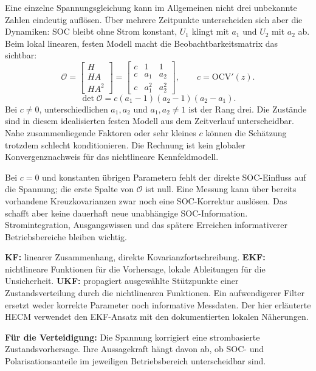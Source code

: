 Eine einzelne Spannungsgleichung kann im Allgemeinen nicht drei unbekannte Zahlen eindeutig auflösen. Über mehrere Zeitpunkte unterscheiden sich aber die Dynamiken: SOC bleibt ohne Strom konstant, $U_1$ klingt mit $a_1$ und $U_2$ mit $a_2$ ab. Beim lokal linearen, festen Modell macht die Beobachtbarkeitsmatrix das sichtbar:
\[
\mathcal O=\begin{bmatrix}H\\HA\\HA^2\end{bmatrix}
=\begin{bmatrix}c&1&1\\c&a_1&a_2\\c&a_1^2&a_2^2\end{bmatrix},
\qquad c=\mathrm{OCV}'(z).
\]
\[
\det\mathcal O=c(a_1-1)(a_2-1)(a_2-a_1).
\]
Bei $c\ne0$, unterschiedlichen $a_1,a_2$ und $a_1,a_2\ne1$ ist der Rang drei. Die Zustände sind in diesem idealisierten festen Modell aus dem Zeitverlauf unterscheidbar. Nahe zusammenliegende Faktoren oder sehr kleines $c$ können die Schätzung trotzdem schlecht konditionieren. Die Rechnung ist kein globaler Konvergenznachweis für das nichtlineare Kennfeldmodell.

Bei $c=0$ und konstanten übrigen Parametern fehlt der direkte SOC-Einfluss auf die Spannung; die erste Spalte von $\mathcal O$ ist null. Eine Messung kann über bereits vorhandene Kreuzkovarianzen zwar noch eine SOC-Korrektur auslösen. Das schafft aber keine dauerhaft neue unabhängige SOC-Information. Stromintegration, Ausgangswissen und das spätere Erreichen informativerer Betriebsbereiche bleiben wichtig.

\textbf{KF:} linearer Zusammenhang, direkte Kovarianzfortschreibung. \textbf{EKF:} nichtlineare Funktionen für die Vorhersage, lokale Ableitungen für die Unsicherheit. \textbf{UKF:} propagiert ausgewählte Stützpunkte einer Zustandsverteilung durch die nichtlinearen Funktionen. Ein aufwendigerer Filter ersetzt weder korrekte Parameter noch informative Messdaten. Der hier erläuterte HECM verwendet den EKF-Ansatz mit den dokumentierten lokalen Näherungen.

\textbf{Für die Verteidigung:} Die Spannung korrigiert eine strombasierte Zustandsvorhersage. Ihre Aussagekraft hängt davon ab, ob SOC- und Polarisationsanteile im jeweiligen Betriebsbereich unterscheidbar sind.

